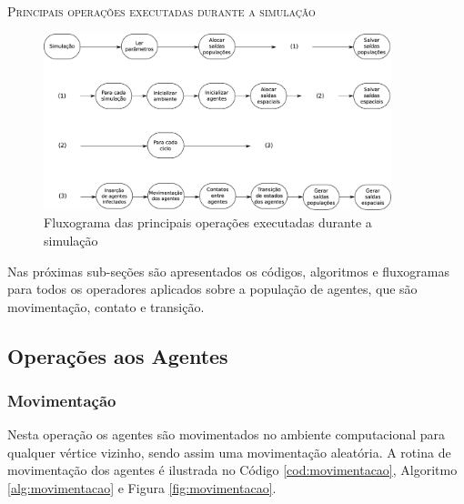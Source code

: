 \newpage

\begin{algorithm}[H]
 \SetAlgoLined
 
 \caption{\textsc{Principais operações executadas durante a simulação}} 
 \label{alg:rotina_principal}
\end{algorithm}

\begin{figure}[H]
  \centering
  \includegraphics[width=0.9\textwidth]{Figuras/EstruturasDadosEstrategias/main.eps}
  \caption{Fluxograma das principais operações executadas durante a simulação}
  \label{fig:rotina_principal}
\end{figure} 

Nas próximas sub-seções são apresentados os códigos, algoritmos e fluxogramas para todos os operadores aplicados sobre a população de agentes, que são movimentação, contato e transição. 

\newpage

\subsection{Operações aos Agentes}

\subsubsection{Movimentação}

Nesta operação os agentes são movimentados no ambiente computacional para qualquer vértice vizinho, sendo assim uma movimentação aleatória. A rotina de movimentação dos agentes é ilustrada no Código \ref{cod:movimentacao}, Algoritmo \ref{alg:movimentacao} e Figura \ref{fig:movimentacao}.  



